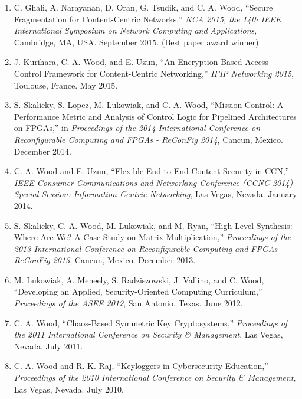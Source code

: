\documentclass[10pt]{res} %
\begin{document}
\begin{resume}
\begin{enumerate}[C-1.]
\item C. Ghali, A. Narayanan, D. Oran, G. Tsudik, and C. A. Wood, ``Secure Fragmentation for Content-Centric Networks,'' \emph{NCA 2015, the 14th IEEE International Symposium on Network Computing and Applications}, Cambridge, MA, USA. September 2015. {\color{red} (Best paper award winner)}

\item J. Kurihara, C. A. Wood, and E. Uzun, ``An Encryption-Based Access Control Framework for Content-Centric Networking,'' \emph{IFIP Networking 2015}, Toulouse, France. May 2015.

\item S. Skalicky, S. Lopez, M. Lukowiak, and C. A. Wood, ``Mission Control: A Performance Metric and Analysis of Control Logic for Pipelined Architectures on FPGAs,'' in {\it Proceedings of the 2014 International Conference on Reconfigurable Computing and FPGAs - ReConFig 2014}, Cancun, Mexico. December 2014.

\item C. A. Wood and E. Uzun, ``Flexible End-to-End Content Security in CCN,'' \emph{IEEE Consumer Communications and Networking Conference (CCNC 2014) Special Session: Information Centric Networking}, Las Vegas, Nevada. January 2014.

\item S. Skalicky, C. A. Wood, M. Lukowiak, and M. Ryan, ``High Level Synthesis: Where Are We? A Case Study on Matrix Multiplication,'' \emph{Proceedings of the 2013 International Conference on Reconfigurable Computing and FPGAs - ReConFig 2013}, Cancun, Mexico. December 2013.

\item M. Lukowiak, A. Meneely, S. Radziszowski, J. Vallino, and C. Wood, ``Developing an Applied, Security-Oriented Computing Curriculum,'' \emph{Proceedings of the ASEE 2012}, San Antonio, Texas. June 2012.

\item C. A. Wood, ``Chaos-Based Symmetric Key Cryptosystems,'' \emph{Proceedings of the 2011 International Conference on Security \& Management}, Las Vegas, Nevada. July 2011.

\item C. A. Wood and R. K. Raj, ``Keyloggers in Cybersecurity Education,'' \emph{Proceedings of the 2010 International Conference on Security \& Management}, Las Vegas, Nevada. July 2010.

\end{enumerate}


\end{resume}
\end{document}
